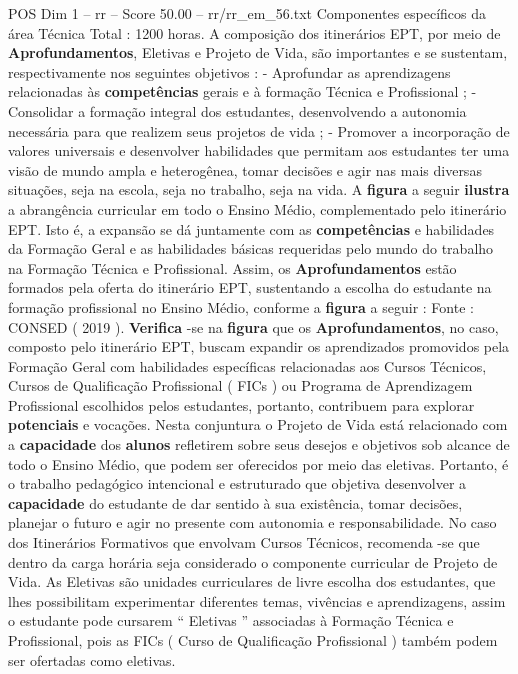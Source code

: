 \begin{textsample}{POS Dim 1 – rr – Score 50.00 – rr/rr\_em\_56.txt}
Componentes específicos da área Técnica Total : 1200 horas.
A composição dos itinerários EPT, por meio de \textbf{Aprofundamentos}, Eletivas e Projeto de Vida, são importantes e se sustentam, respectivamente nos seguintes objetivos : - Aprofundar as aprendizagens relacionadas às \textbf{competências} gerais e à formação Técnica e Profissional ; - Consolidar a formação integral dos estudantes, desenvolvendo a autonomia necessária para que realizem seus projetos de vida ; - Promover a incorporação de valores universais e desenvolver habilidades que permitam aos estudantes ter uma visão de mundo ampla e heterogênea, tomar decisões e agir nas mais diversas situações, seja na escola, seja no trabalho, seja na vida.
A \textbf{figura} a seguir \textbf{ilustra} a abrangência curricular em todo o Ensino Médio, complementado pelo itinerário EPT.
Isto é, a expansão se dá juntamente com as \textbf{competências} e habilidades da Formação Geral e as habilidades básicas requeridas pelo mundo do trabalho na Formação Técnica e Profissional.
Assim, os \textbf{Aprofundamentos} estão formados pela oferta do itinerário EPT, sustentando a escolha do estudante na formação profissional no Ensino Médio, conforme a \textbf{figura} a seguir : Fonte : CONSED ( 2019 ). \textbf{Verifica} -se na \textbf{figura} que os \textbf{Aprofundamentos}, no caso, composto pelo itinerário EPT, buscam expandir os aprendizados promovidos pela Formação Geral com habilidades específicas relacionadas aos Cursos Técnicos, Cursos de Qualificação Profissional ( FICs ) ou Programa de Aprendizagem Profissional escolhidos pelos estudantes, portanto, contribuem para explorar \textbf{potenciais} e vocações.
Nesta conjuntura o Projeto de Vida está relacionado com a \textbf{capacidade} dos \textbf{alunos} refletirem sobre seus desejos e objetivos sob alcance de todo o Ensino Médio, que podem ser oferecidos por meio das eletivas.
Portanto, é o trabalho pedagógico intencional e estruturado que objetiva desenvolver a \textbf{capacidade} do estudante de dar sentido à sua existência, tomar decisões, planejar o futuro e agir no presente com autonomia e responsabilidade.
No caso dos Itinerários Formativos que envolvam Cursos Técnicos, recomenda -se que dentro da carga horária seja considerado o componente curricular de Projeto de Vida.
As Eletivas são unidades curriculares de livre escolha dos estudantes, que lhes possibilitam experimentar diferentes temas, vivências e aprendizagens, assim o estudante pode cursarem “ Eletivas ” associadas à Formação Técnica e Profissional, pois as FICs ( Curso de Qualificação Profissional ) também podem ser ofertadas como eletivas.

\end{textsample}
